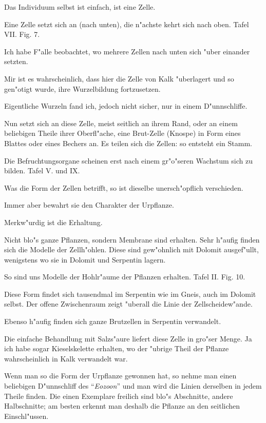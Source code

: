 \documentclass[a4paper, 11pt, oneside, german]{article}
\begin{document}
Das Individuum selbst ist einfach, ist eine Zelle.

Eine Zelle setzt sich an (nach unten), die n"achste kehrt sich nach oben. Tafel VII. Fig. 7.

Ich habe F"alle beobachtet, wo mehrere Zellen nach unten sich "uber einander setzten.

Mir ist es wahrscheinlich, dass hier die Zelle von Kalk "uberlagert und so gen"otigt wurde, ihre Wurzelbildung fortzusetzen.

Eigentliche Wurzeln fand ich, jedoch nicht sicher, nur in einem D"unnschliffe.

Nun setzt sich an diese Zelle, meist seitlich an ihrem Rand, oder an einem beliebigen Theile ihrer Oberfl"ache, eine Brut-Zelle (Knospe) in Form eines Blattes oder eines Bechers an. Es teilen sich die Zellen: so entsteht ein Stamm.

Die Befruchtungsorgane scheinen erst nach einem gr"o"seren Wachstum sich zu bilden. Tafel V. und IX.

Was die Form der Zellen betrifft, so ist dieselbe unersch"opflich verschieden.

Immer aber bewahrt sie den Charakter der Urpflanze.

Merkw"urdig ist die Erhaltung.

Nicht blo"s ganze Pflanzen, sondern Membrane sind erhalten. Sehr h"aufig finden sich die Modelle der Zellh"ohlen. Diese sind gew"ohnlich mit Dolomit ausgef"ullt, wenigstens wo sie in Dolomit und Serpentin lagern.

So sind uns Modelle der Hohlr"aume der Pflanzen erhalten. Tafel II. Fig. 10.

Diese Form findet sich tausendmal im Serpentin wie im Gneis, auch im Dolomit selbst. Der offene Zwischenraum zeigt "uberall die Linie der Zellscheidew"ande.

Ebenso h"aufig finden sich ganze Brutzellen in Serpentin verwandelt.

Die einfache Behandlung mit Salzs"aure liefert diese Zelle in gro"ser Menge. Ja ich habe sogar Kieselskelette erhalten, wo der "ubrige Theil der Pflanze wahrscheinlich in Kalk verwandelt war.

Wenn man so die Form der Urpflanze gewonnen hat, so nehme man einen beliebigen D"unnschliff des "`\emph{Eozoon}"' und man wird die Linien derselben in jedem Theile finden. Die einen Exemplare freilich sind blo"s Abschnitte, andere Halbschnitte; am besten erkennt man deshalb die Pflanze an den seitlichen Einschl"ussen.
\end{document}
